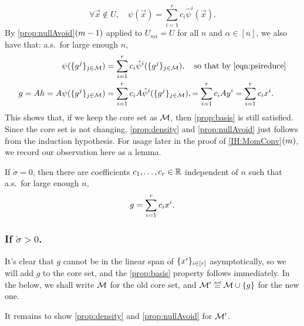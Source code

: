 \documentclass[main.tex]{subfiles}
\begin{document}
\begin{equation*}
\forall \vec x \not \in U,\quad \psi(\vec x) = \sum_{i=1}^r c_i {\hat \psi^i}(\vec x).
\end{equation*}
By \ref{prop:nullAvoid}$(m-1)$ applied to $U_{n\alpha} = U$ for all $n$ and $\alpha \in [n]$, we also have that: a.s.\ for large enough $n$,
\begin{align*}
\psi(\{g^j\}_{j \in \coreset})
&= \sum_{i=1}^r c_i {\hat \psi^i}(\{g^j\}_{j \in \coreset}),
\quad\text{so that by \cref{eqn:psireduce}}
\\
g = Ah = A \psi(\{g^j\}_{j \in \coreset})
&= \sum_{i=1}^r c_i A{\hat \psi^i}(\{g^j\}_{j \in \coreset}),
= \sum_{i=1}^r c_i A\yme^i
= \sum_{i=1}^r c_i \xme^i.
\end{align*}
This shows that, if we keep the core set as $\mathcal{M}$, then \ref{prop:basis} is still satisfied.
Since the core set is not changing, \ref{prop:density} and \ref{prop:nullAvoid} just follows from the induction hypothesis.
For usage later in the proof of \ref{IH:MomConv}$(m)$, we record our observation here as a lemma.
\begin{lemma}\label{lemma:limitSigmaIsZero}
If $\mathring \sigma = 0$, then there are coefficients $c_1, \ldots, c_r \in \mathbb{R}$ independent of $n$ such that a.s.\ for large enough $n$,
\[
g = \sum_{i = 1}^r c_i x^i.
\]
\end{lemma}

\subsubsection{If \texorpdfstring{$\mathring \sigma > 0$}{sigma converges to nonzero value a.s.}.}

\newcommand{\prvZ}{\mathcal{Z}}

It's clear that $g$ cannot be in the linear span of $\{x^i\}_{i\in[r]}$ asymptotically, so we will add $g$ to the core set, and the \ref{prop:basis} property follows immediately.
In the below, we shall write $\mathcal{M}$ for the old core set, and $\coreset' \defeq \coreset \cup \{g\}$ for the new one.

It remains to show \ref{prop:density} and \ref{prop:nullAvoid} for $\mathcal{M}'$.
\end{document}
